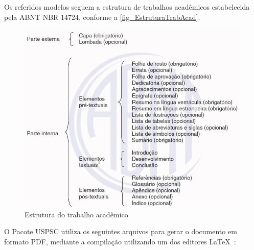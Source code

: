 Os referidos modelos seguem a estrutura de trabalhos acadêmicos estabelecida pela ABNT NBR 14724, conforme a \autoref{fig_EstruturaTrabAcad}. 

\newpage
\begin{figure}[htb]
	\caption{\label{fig_EstruturaTrabAcad}Estrutura do trabalho acadêmico}
	\begin{center}
		\includegraphics[scale=0.5]{USPSC-EstruturaTrabAcad.jpg}
	\end{center}
\end{figure}
		
O Pacote USPSC utiliza os seguintes arquivos para gerar o documento em formato PDF, mediante a compilação utilizando um dos editores \LaTeX\ :

